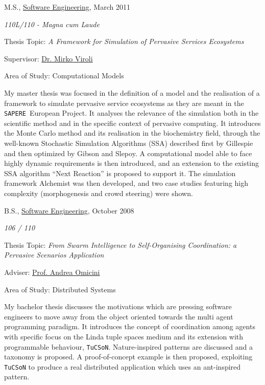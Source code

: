 \documentclass[10pt]{article}
\newcommand{\sapere}{\texttt{SAPERE}}
\newenvironment{outerlist}[1][\enskip\textbullet]%
        {\begin{itemize}[#1]}{\end{itemize}%
         \vspace{-.6\baselineskip}}
\newenvironment{innerlist}[1][\enskip\textbullet]%
        {\begin{compactitem}[#1]}{\end{compactitem}}
\newcommand{\halfblankline}{\quad\vspace{-0.5\baselineskip}\pagebreak[3]}
\begin{document}
\begin{outerlist}
\item[] M.S.,
        \href{http://www.ing2.unibo.it/Ingegneria+Cesena/default.htm}
             {Software Engineering}, March 2011
        \begin{innerlist}
        \item \emph{110L/110 - Magna cum Laude}
        \item Thesis Topic: \emph{A Framework for Simulation of Pervasive Services Ecosystems}
        \item Supervisor:
              \href{http://www.ingce.unibo.it/~mviroli/}
                   {Dr. Mirko Viroli}
        \item Area of Study: Computational Models
        \end{innerlist}
 My master thesis was focused in the definition of a model and the realisation of a framework to simulate pervasive service ecosystems as they are meant in the \sapere\ European Project. It analyses the relevance of the simulation both in the scientific method and in the specific context of pervasive computing. It introduces the Monte Carlo method and its realisation in the biochemistry field, through the well-known Stochastic Simulation Algorithms (SSA) described first by Gillespie and then optimized by Gibson and Slepoy. A computational model able to face highly dynamic requirements is then introduced, and an extension to the existing SSA algorithm ``Next Reaction'' is proposed to support it. The simulation framework Alchemist was then developed, and two case studies featuring high complexity (morphogenesis and crowd steering) were shown.

\item[] B.S.,
        \href{http://www.ing2.unibo.it/Ingegneria+Cesena/default.htm}
             {Software Engineering}, October 2008
        \begin{innerlist}
        \item \emph{106 / 110}
        \item Thesis Topic: \emph{From Swarm Intelligence to Self-Organising Coordination: a Pervasive Scenarios Application}
        \item Adviser:
              \href{http://apice.unibo.it/xwiki/bin/view/AndreaOmicini/}
                   {Prof. Andrea Omicini}
        \item Area of Study: Distributed Systems
        \end{innerlist}
 My bachelor thesis discusses the motivations which are pressing software engineers to move away from the object oriented towards the multi agent programming paradigm. It introduces the concept of coordination among agents with specific focus on the Linda tuple spaces medium and its extension with programmable behaviour, \texttt{TuCSoN}. Nature-inspired patterns are discussed and a taxonomy is proposed. A proof-of-concept example is then proposed, exploiting \texttt{TuCSoN} to produce a real distributed application which uses an ant-inspired pattern.

\halfblankline
\end{outerlist}
\end{document}
